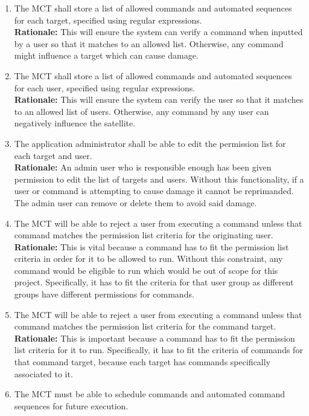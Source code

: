 \documentclass[12pt]{article}
\begin{document}
\begin{enumerate}
    \item The MCT shall store a list of allowed commands and automated sequences for each target, specified using regular expressions. \\
    \textbf{Rationale:} This will ensure the system can verify a command when inputted by a user so that it matches to an allowed list. Otherwise, any command might influence a target which can cause damage. 
    \item The MCT shall store a list of allowed commands and automated sequences for each user, specified using regular expressions. \\
    \textbf{Rationale:} This will ensure the system can verify the user so that it matches to an allowed list of users. Otherwise, any command by any user can negatively influence the satellite. 
    \item The application administrator shall be able to edit the permission list for each target and user. \\
    \textbf{Rationale:} An admin user who is responsible enough has been given permission to edit the list of targets and users. Without this functionality, if a user or command is attempting to cause damage it cannot be reprimanded. The admin user can remove or delete them to avoid said damage. 
    \item The MCT will be able to reject a user from executing a command unless that command matches the permission list criteria for the originating user. \\
    \textbf{Rationale:} This is vital because a command has to fit the permission list criteria in order for it to be allowed to run. Without this constraint, any command would be eligible to run which would be out of scope for this project. Specifically, it has to fit the criteria for that user group as different groups have different permissions for commands. 
    \item The MCT will be able to reject a user from executing a command unless that command matches the permission list criteria for the command target. \\
    \textbf{Rationale:} This is important because a command has to fit the permission list criteria for it to run. Specifically, it has to fit the criteria of commands for that command target, because each target has commands specifically associated to it. 
    \item The MCT must be able to schedule commands and automated command sequences for future execution. \\

\end{enumerate}
\end{document}
